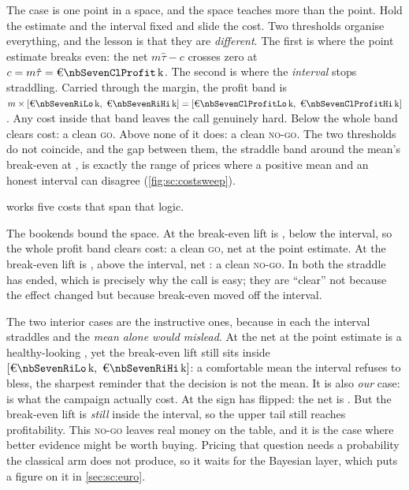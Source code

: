 The \keur{\nbSevenCost} case is one point in a space, and the space teaches more than the point. Hold
the estimate and the interval fixed and slide the cost. Two thresholds organise everything, and the
lesson is that they are \emph{different}. The first is where the point estimate breaks even: the net
$m\hat\tau - c$ crosses zero at $c = m\hat\tau = \keur{\nbSevenClProfit}$. The second is where the
\emph{interval} stops straddling. Carried through the margin, the profit band is
$m\times[\keur{\nbSevenRiLo},\ \keur{\nbSevenRiHi}]
= [\keur{\nbSevenClProfitLo},\ \keur{\nbSevenClProfitHi}]$. Any cost inside that band leaves the
call genuinely hard. Below \keur{\nbSevenClProfitLo} the whole band clears cost: a clean \textsc{go}.
Above \keur{\nbSevenClProfitHi} none of it does: a clean \textsc{no-go}. The two thresholds do not
coincide, and the gap between them, the straddle band around the mean's break-even at
\keur{\nbSevenClProfit}, is exactly the range of prices where a positive mean and an honest interval can
disagree (\cref{fig:sc:costsweep}).

 works five costs that span that logic.




The bookends bound the space. At \keur{\nbSevenSweepGoC} the break-even lift is \keur{\nbSevenSweepGoBe},
below the interval, so the whole profit band clears cost: a clean \textsc{go}, net \keur{\nbSevenSweepGoNet}
at the point estimate. At \keur{\nbSevenSweepNgC} the break-even lift is \keur{\nbSevenSweepNgBe}, above
the interval, net \keur{\nbSevenSweepNgNet}: a clean \textsc{no-go}. In both the straddle has ended,
which is precisely why the call is easy; they are ``clear'' not because the effect changed but because
break-even moved off the interval.

The two interior cases are the instructive ones, because in each the interval straddles and the
\emph{mean alone would mislead}. At \keur{\nbSevenSweepLoC} the net at the point estimate is a
healthy-looking \keur{\nbSevenSweepLoNet}, yet the break-even lift \keur{\nbSevenSweepLoBe} still sits
inside $[\keur{\nbSevenRiLo},\ \keur{\nbSevenRiHi}]$: a comfortable mean the interval refuses to bless,
the sharpest reminder that the decision is not the mean. It is also \emph{our} case:
\keur{\nbSevenSweepLoC} is what the campaign actually cost. At \keur{\nbSevenSweepHiC} the sign has
flipped: the net is \keur{\nbSevenSweepHiNet}. But the break-even lift \keur{\nbSevenSweepHiBe} is
\emph{still} inside the interval, so the upper tail still reaches profitability. This \textsc{no-go}
leaves real money on the table, and it is the case where better evidence might be worth buying.
Pricing that question needs a probability the classical arm does not produce,
so it waits for the Bayesian layer, which puts a figure on it in \cref{sec:sc:euro}.%

